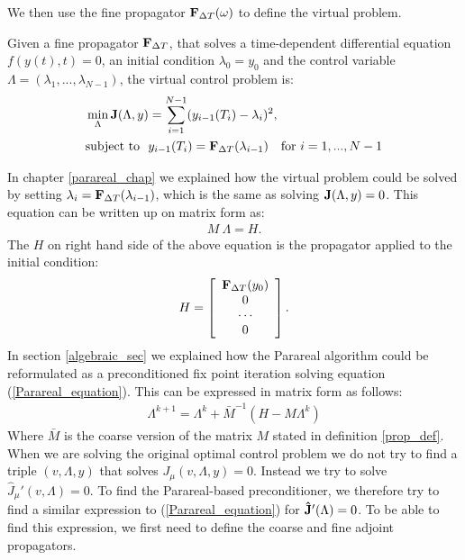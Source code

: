 \noindent
We then use the fine propagator $\bold F_{\Delta T}(\omega)$ to define the virtual problem.
\begin{definition}
Given a fine propagator $\bold F_{\Delta T}$, that solves a time-dependent differential equation $f(y(t),t)=0$, an initial condition $\lambda_0=y_0$ and the control variable $\Lambda=(\lambda_1,...,\lambda_ {N-1})$, the virtual control problem is:
\begin{align}
&\min_{\Lambda}\bold{J}(\Lambda,y) = \sum_{i=1}^{N-1} (y_{i-1}(T_{i})-\lambda_{i})^2, \label{virtual_func} \\
&\textrm{subject to } \ y_{i-1}(T_{i}) = \bold F_{\Delta T}(\lambda_{i-1})\quad \textrm{for} \ i=1,...,N-1 \label{virtual}
\end{align}
\end{definition}
\noindent
In chapter \ref{parareal_chap} we explained how the virtual problem could be solved by setting $\lambda_i= \bold F_{\Delta T}(\lambda_{i-1})$, which is the same as solving $\bold J(\Lambda,y)=0$. This equation can be written up on matrix form as:
\begin{align}
M \ \Lambda = H. \label{Parareal_equation}
\end{align}
The $H$ on right hand side of the above equation is the propagator applied to the initial condition:
\begin{align*}
H = \left[ \begin{array}{c}
   \bold F_{\Delta T}( y_0) \\
   0 \\
   \cdots \\
   0 \\
   \end{array}  \right].
\end{align*}
In section \ref{algebraic_sec} we explained how the Parareal algorithm could be reformulated as a preconditioned fix point iteration solving equation (\ref{Parareal_equation}). This can be expressed in matrix form as follows:
\begin{align}
\Lambda^{k+1} = \Lambda^k + \bar{M}^{-1}(H-M\Lambda^k)\label{par_mat_sys}
\end{align}
Where $\bar{M}$ is the coarse version of the matrix $M$ stated in definition \ref{prop_def}. When we are solving the original optimal control problem we do not try to find a triple $(v,\Lambda,y)$ that solves $J_{\mu}(v,\Lambda,y)=0$. Instead we try to solve $\hat J_{\mu}'(v,\Lambda)=0$. To find the Parareal-based preconditioner, we therefore try to find a similar expression to (\ref{Parareal_equation}) for $\bold{\hat{J}}'(\Lambda)=0$. To be able to find this expression, we first need to define the coarse and fine adjoint propagators.
